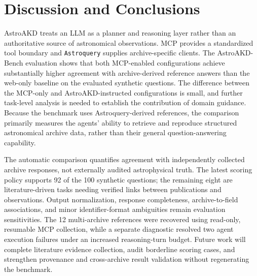 \documentclass[11pt,twoside]{article}
\begin{document}

\section{Discussion and Conclusions}

AstroAKD treats an LLM as a planner and reasoning layer rather than an authoritative source of astronomical observations. MCP provides a standardized tool boundary and {\tt Astroquery} supplies archive-specific clients. %
The AstroAKD-Bench evaluation shows that both MCP-enabled configurations achieve substantially higher agreement with archive-derived reference answers than the web-only baseline on the evaluated synthetic questions. The difference between the MCP-only and AstroAKD-instructed configurations is small, and further task-level analysis is needed to establish the contribution of domain guidance.
Because the benchmark uses Astroquery-derived references, the comparison primarily measures the agents' ability to retrieve and reproduce structured astronomical archive data, rather than their general question-answering capability.


The automatic comparison quantifies agreement with independently collected archive responses, not externally audited astrophysical truth. The latest scoring policy supports 92 of the 100 synthetic questions; the remaining eight are literature-driven tasks needing verified links between publications and observations. Output normalization, response completeness, archive-to-field associations, and minor identifier-format ambiguities remain evaluation sensitivities. The 12 multi-archive references were recovered using read-only, resumable MCP collection, while a separate diagnostic resolved two agent execution failures under an increased reasoning-turn budget. Future work will complete literature evidence collection, audit borderline scoring cases, and strengthen provenance and cross-archive result validation without regenerating the benchmark.
\end{document}

